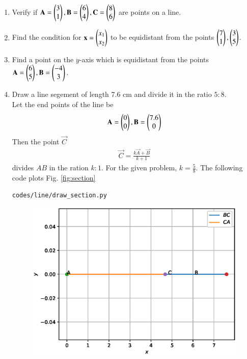 \renewcommand{\theequation}{\theenumi}
\begin{enumerate}[label=\arabic*.,ref=\thesubsection.\theenumi]


\item Verify if $\mathbf{A} = \begin{pmatrix}3\\1\end{pmatrix}, \mathbf{B} = \begin{pmatrix}6\\4\end{pmatrix}, \mathbf{C} = \begin{pmatrix}8\\6\end{pmatrix}$ are points on a line.
\item Find the condition for $\mathbf{x} = \begin{pmatrix}x_1\\x_2\end{pmatrix}$ to be equidistant from the points $\begin{pmatrix}7\\1\end{pmatrix}, \begin{pmatrix}3\\5\end{pmatrix}$.
\item Find a point on the $y$-axis which is equidistant from the points $\mathbf{A} = \begin{pmatrix}6\\5\end{pmatrix}, \mathbf{B} = \begin{pmatrix}-4\\3\end{pmatrix}$.
\item Draw a line segement of length 7.6 cm and divide it in the ratio $5:8$.
\\
\solution Let the end points of the line be 
\begin{align}
\mathbf{A} = \begin{pmatrix}0\\0\end{pmatrix}, \mathbf{B} = \begin{pmatrix}7.6\\0\end{pmatrix}
\end{align}
Then the point $\vec{C}$
\begin{align}
\vec{C} = \frac{k \vec{A} + \vec{B}}{k+1}
\end{align}
divides $AB$ in the ration $k:1$. For the given problem, $k = \frac{5}{8}$.
The following code plots Fig. \ref{fig:section}
\begin{lstlisting}
codes/line/draw_section.py
\end{lstlisting}
\begin{figure}[!ht]
\includegraphics[width=\columnwidth]{./line/figs/section.eps}

\end{figure}
\end{enumerate}
